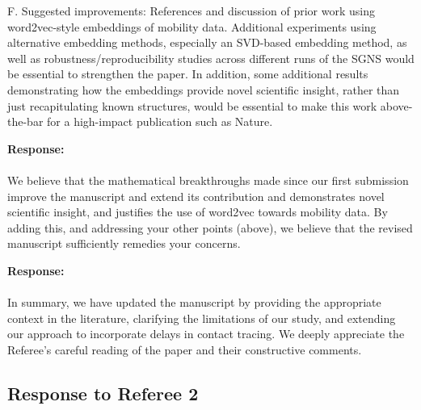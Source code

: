 \documentclass[12pt,a4paper]{article}
\newcommand{\response}[1]{{\noindent \textbf{Response:} \\ \\ \noindent #1}}
\newcommand{\rcomment}[1]{%
\vspace{10pt}
\begin{tcolorbox}[colback=black!3,colframe=white!45!black, left=0pt, right=0pt, top=0pt, bottom=0pt, arc=0pt,outer arc=0pt, grow to left by=-0.5cm,grow to right by=-0.5cm]
#1
\end{tcolorbox}
}
\begin{document}
\rcomment{%
F. Suggested improvements:
References and discussion of prior work using word2vec-style embeddings of mobility data.
Additional experiments using alternative embedding methods, especially an SVD-based embedding method, as well as robustness/reproducibility studies across different runs of the SGNS would be essential to strengthen the paper.
In addition, some additional results demonstrating how the embeddings provide novel scientific insight, rather than just recapitulating known structures, would be essential to make this work above-the-bar for a high-impact publication such as Nature.

}


\response{We believe that the mathematical breakthroughs made since our first submission improve the manuscript and extend its contribution and demonstrates novel scientific insight, and justifies the use of word2vec towards mobility data. By adding this, and addressing your other points (above), we believe that the revised manuscript sufficiently remedies your concerns. 

}

\bigskip
\response{In summary, we have updated the manuscript by providing the appropriate context in the literature, clarifying the limitations of our study, and extending our approach to incorporate delays in contact tracing. We deeply appreciate the Referee's careful reading of the paper and their constructive comments. 
}


\subsection{Response to Referee 2}
\end{document}
